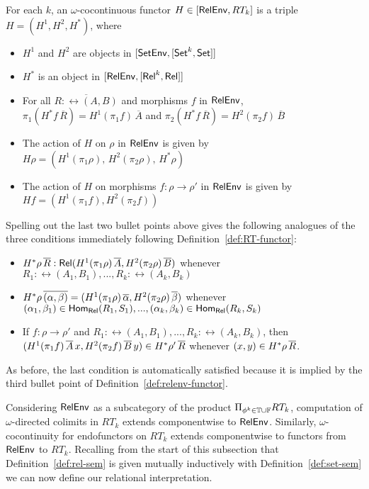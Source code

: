 \documentclass{lmcs}
\theoremstyle{plain}\newtheorem{satz}[thm]{Satz}
\newcommand{\set}{\mathsf{Set}}
\begin{document}
{\begin{defi}\label{def:relenv-functor}
For each $k$, an $\omega$-cocontinuous functor $H \in [\mathsf{RelEnv}, RT_k]$
is a triple $H = (H^1,H^2,H^*)$, where
\begin{itemize}
\item $H^1$ and $H^2$ are objects in $[\setenv,[\set^k,\set]]$
\item $H^*$ is an object in $[\mathsf{RelEnv},[\mathsf{Rel}^k,\mathsf{Rel}]]$
\item For all $\overline{R : \rel(A,B)}$ and morphisms $f$ in
  $\mathsf{RelEnv}$, $\pi_1(H^*f \,{\overline{R}}) = H^1 (\pi_1
  f)\,{\overline{A}}$ and $\pi_2(H^*f \,{\overline{R}}) = H^2 (\pi_2
  f)\,{\overline{B}}$
\item The action of $H$ on $\rho$ in $\mathsf{RelEnv}$ is given by $H \rho = (H^1
  (\pi_1 \rho),\,H^2 (\pi_2 \rho),\,H^*\rho)$
\item The action of $H$ on morphisms $f : \rho \to \rho'$ in $\mathsf{RelEnv}$
  is given by $Hf = (H^1 (\pi_1 f),H^2 (\pi_2 f))$
\end{itemize}
\end{defi}
\noindent Spelling out the last two bullet points above gives the
following analogues of the three conditions immediately following
Definition~\ref{def:RT-functor}:
\begin{itemize}
\item $H^*\rho\, \overline{R} : \mathsf{Rel}(H^1(\pi_1 \rho)\, \overline{A}, H^2(\pi_2
  \rho)\, \overline{B})$ whenever $R_1 : \rel(A_1,B_1),...,R_k :
  \rel(A_k,B_k)$
\item $H^*\rho\, \overline{(\alpha, \beta)} = (H^1(\pi_1 \rho)\,\overline{\alpha},
  H^2(\pi_2 \rho)\, \overline{\beta})$ whenever $(\alpha_1, \beta_1) \in
  \mathsf{Hom_{Rel}}(R_1,S_1),..., (\alpha_k, \beta_k) \in \mathsf{Hom_{Rel}}(R_k,S_k)$
\item If $f : \rho \to \rho'$ and
  $R_1:\rel(A_1,B_1),...,R_k:\rel(A_k,B_k)$, then $(H^1(\pi_1
  f)\,{\overline{A}}\,x, H^2(\pi_2 f)\,{\overline{B}}\,y) \in H^*\rho'\,\overline{R}$
  whenever $(x, y) \in H^*\rho\,\overline{R}$.
\end{itemize}
As before, the last condition is automatically satisfied because it is
implied by the third bullet point of
Definition~\ref{def:relenv-functor}.

Considering $\mathsf{RelEnv}$ as a subcategory of the product $\Pi_{\phi^k \in
  \mathbb{T} \cup \mathbb{F}} RT_k$, computation of $\omega$-directed colimits
in $RT_k$ extends componentwise to $\mathsf{RelEnv}$. Similarly,
$\omega$-cocontinuity for endofunctors on $RT_k$ extends componentwise
to functors from $\mathsf{RelEnv}$ to $RT_k$.  Recalling from the start of
this subsection that Definition~\ref{def:rel-sem} is given mutually
inductively with Definition~\ref{def:set-sem} we can now define our
relational interpretation.

}
\end{document}
